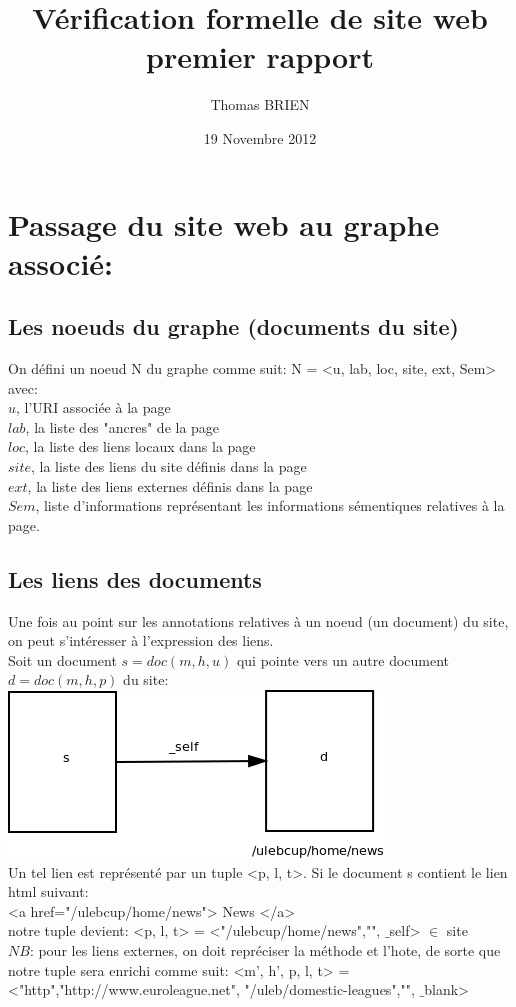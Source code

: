 \documentclass[a4paper]{article}
\title{Vérification formelle de site web\\premier rapport}
\author{Thomas BRIEN}
\date{19 Novembre 2012}
\begin{document}
\maketitle
\section{Passage du site web au graphe associé:\\}


\subsection*{ Les noeuds du graphe (documents du site)\\ }
 On défini un noeud N du graphe comme suit: N = <u, lab, loc, site, ext, Sem>\\
 avec:\\
 $u$, l'URI associée à la page\\
 $lab$, la liste des "ancres" de la page\\
 $loc$, la liste des liens locaux dans la page\\
 $site$, la liste des liens du site définis dans la page\\
 $ext$, la liste des liens externes définis dans la page\\
 $Sem$, liste d'informations représentant les informations sémentiques relatives à la page.\\
 
\subsection*{ Les liens des documents\\ }
Une fois au point sur les annotations relatives à un noeud (un document) du site, on peut s'intéresser à l'expression des liens.\\
Soit un document $s = doc(m,h,u)$ qui pointe vers un autre document $d = doc(m,h,p)$ du site:\\
\includegraphics[scale=0.6]{lienSimple.png}\\
Un tel lien est représenté par un tuple <p, l, t>. Si le document s contient le lien html suivant:\\
<a href="/ulebcup/home/news"> News </a>\\
notre tuple devient: <p, l, t> = <"/ulebcup/home/news","", $\_$self> $\in$ site\\
$NB$: pour les liens externes, on doit repréciser la méthode et l'hote, de sorte que notre tuple sera enrichi comme suit: <m', h', p, l, t> = <"http","http://www.euroleague.net",
"/uleb/domestic-leagues","", $\_$blank>\\
\end{document}
